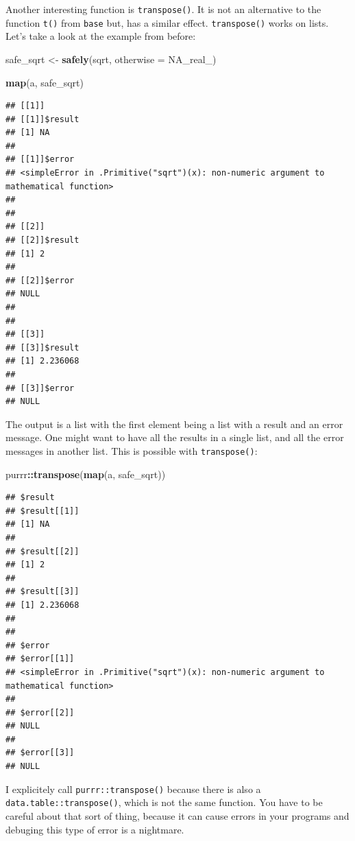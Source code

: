 \documentclass[]{gitbook}
\newenvironment{Shaded}{\begin{snugshade}}{\end{snugshade}}
\newcommand{\DataTypeTok}[1]{\textcolor[rgb]{0.13,0.29,0.53}{#1}}
\newcommand{\KeywordTok}[1]{\textcolor[rgb]{0.13,0.29,0.53}{\textbf{#1}}}
\newcommand{\NormalTok}[1]{#1}
\newcommand{\OperatorTok}[1]{\textcolor[rgb]{0.81,0.36,0.00}{\textbf{#1}}}
\newcommand{\OtherTok}[1]{\textcolor[rgb]{0.56,0.35,0.01}{#1}}
\newcommand{\StringTok}[1]{\textcolor[rgb]{0.31,0.60,0.02}{#1}}
\begin{document}
Another interesting function is \texttt{transpose()}. It is not an alternative to the function \texttt{t()} from
\texttt{base} but, has a similar effect. \texttt{transpose()} works on lists. Let's take a look at the example
from before:

\begin{Shaded}
\begin{Highlighting}[]
\NormalTok{safe_sqrt <-}\StringTok{ }\KeywordTok{safely}\NormalTok{(sqrt, }\DataTypeTok{otherwise =} \OtherTok{NA_real_}\NormalTok{)}

\KeywordTok{map}\NormalTok{(a, safe_sqrt)}
\end{Highlighting}
\end{Shaded}

\begin{verbatim}
## [[1]]
## [[1]]$result
## [1] NA
## 
## [[1]]$error
## <simpleError in .Primitive("sqrt")(x): non-numeric argument to mathematical function>
## 
## 
## [[2]]
## [[2]]$result
## [1] 2
## 
## [[2]]$error
## NULL
## 
## 
## [[3]]
## [[3]]$result
## [1] 2.236068
## 
## [[3]]$error
## NULL
\end{verbatim}

The output is a list with the first element being a list with a result and an error message. One
might want to have all the results in a single list, and all the error messages in another list.
This is possible with \texttt{transpose()}:

\begin{Shaded}
\begin{Highlighting}[]
\NormalTok{purrr}\OperatorTok{::}\KeywordTok{transpose}\NormalTok{(}\KeywordTok{map}\NormalTok{(a, safe_sqrt))}
\end{Highlighting}
\end{Shaded}

\begin{verbatim}
## $result
## $result[[1]]
## [1] NA
## 
## $result[[2]]
## [1] 2
## 
## $result[[3]]
## [1] 2.236068
## 
## 
## $error
## $error[[1]]
## <simpleError in .Primitive("sqrt")(x): non-numeric argument to mathematical function>
## 
## $error[[2]]
## NULL
## 
## $error[[3]]
## NULL
\end{verbatim}

I explicitely call \texttt{purrr::transpose()} because there is also a \texttt{data.table::transpose()}, which
is not the same function. You have to be careful about that sort of thing, because it can cause
errors in your programs and debuging this type of error is a nightmare.
\end{document}
